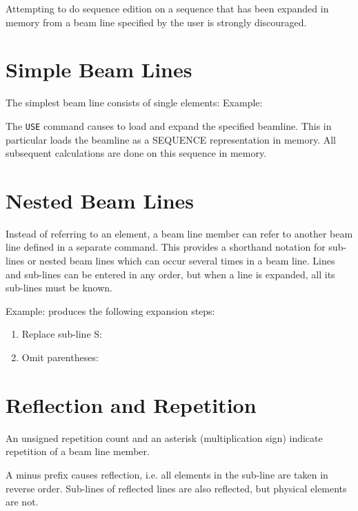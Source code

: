 Attempting to do sequence edition on a sequence that has
been expanded in memory from a beam line specified by the user is
strongly discouraged.

\section{Simple Beam Lines} 
\label{sec:beamline}
The simplest beam line consists of single elements: 
Example: 

The \texttt{USE} command causes \madx to load and expand the specified
beamline. This in particular loads the beamline as a SEQUENCE
representation in memory. All subsequent calculations are done on this
sequence in memory.  

\section{Nested Beam Lines}
\label{sec:sublines}

Instead of referring to an element, a beam line member can refer to
another beam line defined in a separate command. This provides a
shorthand notation for sub-lines or nested beam lines which can occur
several times in a beam line. 
Lines and sub-lines can be entered in any order, but when a line is
expanded, all its sub-lines must be known.   

Example: 
produces the following expansion steps: 
\begin{enumerate}
  \item Replace sub-line S: 
  \item Omit parentheses: 
\end{enumerate}

\section{Reflection and Repetition} 
\label{sec:reflect_repeat_lines}
An unsigned repetition count and an asterisk (multiplication sign)
indicate repetition of a beam line member. 

A minus prefix causes reflection, i.e. all elements in the sub-line are
taken in reverse order. 
Sub-lines of reflected lines are also reflected, but physical elements
are not. 

